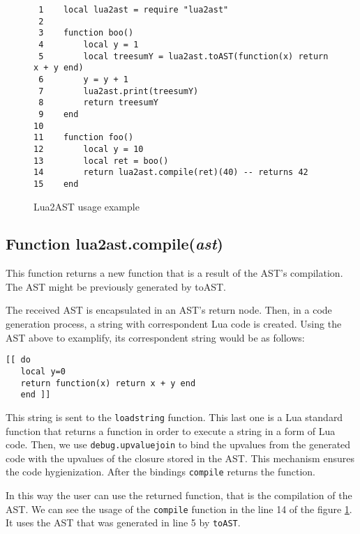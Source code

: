 \documentclass[english]{llncs}
\begin{document}
\begin{figure}[t]
\begin{verbatim}
 1    local lua2ast = require "lua2ast"
 2    
 3    function boo()
 4        local y = 1
 5        local treesumY = lua2ast.toAST(function(x) return x + y end)
 6        y = y + 1
 7        lua2ast.print(treesumY)
 8        return treesumY
 9    end
10    
11    function foo()	
12        local y = 10
13        local ret = boo()
14        return lua2ast.compile(ret)(40) -- returns 42
15    end
\end{verbatim}
\protect\caption{\label{fig:Lua2ASTExample}Lua2AST usage example}
\end{figure}

\subsection{Function lua2ast.compile(\emph{ast})}

This function returns a new function that is a result of the AST's compilation. 
The AST might be previously generated by toAST.


The received AST is encapsulated in an AST's return node.
Then, in a code generation process, a string with correspondent Lua code is created.
Using the AST above to examplify, its correspondent string would be as follows:

\begin{verbatim}
[[ do 
   local y=0 
   return function(x) return x + y end 
   end ]]
\end{verbatim}

This string is sent to the \texttt{loadstring} function.
This last one is a Lua standard function that returns a function in order to execute a string in a form of Lua code.
Then, we use \texttt{debug.upvaluejoin} to bind the upvalues from the generated code with the upvalues of the closure stored in the AST.
This mechanism ensures the code hygienization.
After the bindings \texttt{compile} returns the function.

In this way the user can use the returned function, that is the compilation of the AST.
We can see the usage of the \texttt{compile} function in the line 14 of the figure \ref{fig:Lua2ASTExample}.
It uses the AST that was generated in line 5 by \texttt{toAST}.



\end{document}
